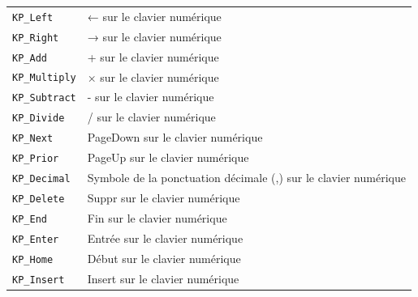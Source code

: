 \documentclass[11pt,a4paper]{article}
\begin{document}
\begin{tabular}{ll}
{\tt KP\_Left} 	& 	← sur le clavier numérique\\
{\tt KP\_Right} 	& 	→ sur le clavier numérique\\
{\tt KP\_Add} 	& 	+ sur le clavier numérique\\
{\tt KP\_Multiply} 	& 	× sur le clavier numérique\\
{\tt KP\_Subtract} 	& 	- sur le clavier numérique\\
{\tt KP\_Divide} 	& 	/ sur le clavier numérique\\
{\tt KP\_Next} 	& 	PageDown sur le clavier numérique\\
{\tt KP\_Prior} 	& 	PageUp sur le clavier numérique\\
{\tt KP\_Decimal} 	& 	Symbole de la ponctuation décimale (,) sur le clavier numérique\\
{\tt KP\_Delete} 	& 	Suppr sur le clavier numérique\\
{\tt KP\_End} 	& 	Fin sur le clavier numérique\\
{\tt KP\_Enter} 	& 	Entrée sur le clavier numérique\\
{\tt KP\_Home} 	& 	Début sur le clavier numérique\\
{\tt KP\_Insert} 	& 	Insert sur le clavier numérique\\
\end{tabular}{}
\end{document}
